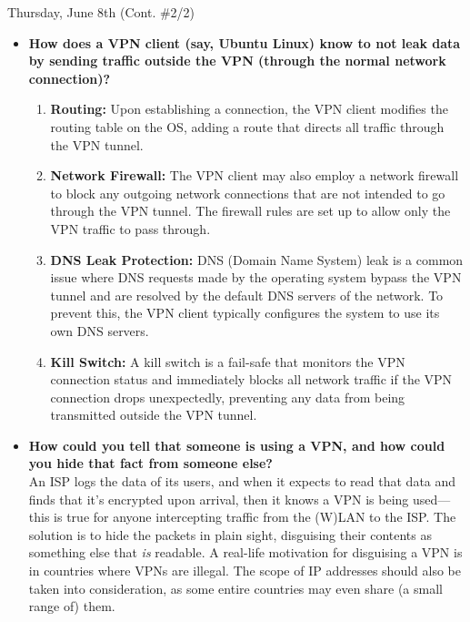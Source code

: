 \documentclass[11pt]{article}
\begin{document}
\begin{orangebox}{Thursday, June 8th (Cont. \#2/2)\vspace{-2.2em}\begin{flushright}\end{flushright}}
\begin{itemize}
    \item\textbf{How does a VPN client (say, Ubuntu Linux) know to not leak data by sending traffic outside the VPN (through the normal network connection)?}
    \begin{enumerate}
        \item\textbf{Routing:} Upon establishing a connection, the VPN client modifies the routing table on the OS, adding a route that directs all traffic through the VPN tunnel.
        \item\textbf{Network Firewall:} The VPN client may also employ a network firewall to block any outgoing network connections that are not intended to go through the VPN tunnel. The firewall rules are set up to allow only the VPN traffic to pass through.
        \item\textbf{DNS Leak Protection:} DNS (Domain Name System) leak is a common issue where DNS requests made by the operating system bypass the VPN tunnel and are resolved by the default DNS servers of the network. To prevent this, the VPN client typically configures the system to use its own DNS servers.
        \item\textbf{Kill Switch:} A kill switch is a fail-safe that monitors the VPN connection status and immediately blocks all network traffic if the VPN connection drops unexpectedly, preventing any data from being transmitted outside the VPN tunnel.
    \end{enumerate}
    \item\textbf{How could you tell that someone is using a VPN, and how could you hide that fact from someone else?} \\
    \phantom{~~~~} An ISP logs the data of its users, and when it expects to read that data and finds that it's encrypted upon arrival, then it knows a VPN is being used---this is true for anyone intercepting traffic from the (W)LAN to the ISP. The solution is to hide the packets in plain sight, disguising their contents as something else that \textit{is} readable. A real-life motivation for disguising a VPN is in countries where VPNs are illegal. The scope of IP addresses should also be taken into consideration, as some entire countries may even share (a small range of) them.

\end{itemize}
\end{orangebox}
\end{document}
